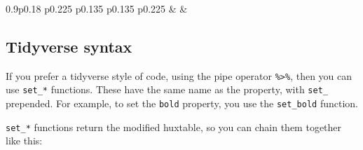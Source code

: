 \documentclass[]{article}
\begin{document}
\begin{table}[h]
\begin{raggedright}
\begin{tabularx}{0.9\textwidth}{p{} p{} p{} p{} p{}}
 & 
 & 
\tabularnewline[-0.5pt]


\end{tabularx}
\par\end{raggedright}
\end{table}
\FloatBarrier

\hypertarget{tidyverse-syntax}{%
\subsection{Tidyverse syntax}\label{tidyverse-syntax}}

If you prefer a tidyverse style of code, using the pipe operator
\texttt{\%\textgreater{}\%}, then you can use \texttt{set\_*} functions.
These have the same name as the property, with \texttt{set\_} prepended.
For example, to set the \texttt{bold} property, you use the
\texttt{set\_bold} function.

\texttt{set\_*} functions return the modified huxtable, so you can chain
them together like this:
\end{document}
